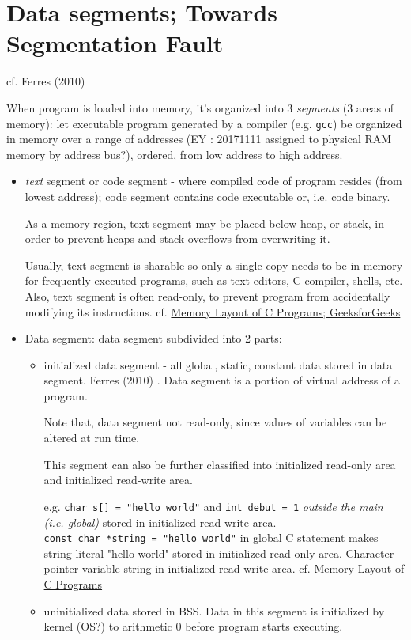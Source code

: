 \documentclass[10pt]{amsart}
\begin{document}
\section{Data segments; Towards Segmentation Fault}

cf. Ferres (2010) \cite{Ferr2010}

When program is loaded into memory, it's organized into 3 \emph{segments} (3 areas of memory):  
let executable program generated by a compiler (e.g. \verb|gcc|) be organized in memory over a range of addresses (EY : 20171111 assigned to physical RAM memory by address bus?), ordered, from low address to high address.  
\begin{itemize}
	\item \emph{text} segment or code segment - where compiled code of program resides (from lowest address); code segment contains code executable or, i.e. code binary.  
	
	As a memory region, text segment may be placed below heap, or stack, in order to prevent heaps and stack overflows from overwriting it.  
	
	Usually, text segment is sharable so only a single copy needs to be in memory for frequently executed programs, such as text editors, C compiler, shells, etc.  Also, text segment is often read-only, to prevent program from accidentally modifying its instructions.  	
	cf. \href{http://www.geeksforgeeks.org/memory-layout-of-c-program/}{Memory Layout of C Programs; GeeksforGeeks}  
	\item Data segment:  data segment subdivided into 2 parts:
	\begin{itemize}
		\item initialized data segment - all global, static, constant data stored in data segment. Ferres (2010) \cite{Ferr2010}.  Data segment is a portion of virtual address of a program.  
		
		Note that, data segment not read-only, since values of variables can be altered at run time.  
		
		This segment can also be further classified into initialized read-only area and initialized read-write area.  
		
		e.g. \verb|char s[] = "hello world"| and \verb|int debut = 1| \emph{outside the main (i.e. global)} stored in initialized read-write area.  \\
		\verb|const char *string = "hello world"| in global C statement makes string literal "hello world" stored in initialized read-only area.  Character pointer variable string in initialized read-write area.  
		cf. \href{http://www.geeksforgeeks.org/memory-layout-of-c-program/}{Memory Layout of C Programs}  
		\item uninitialized data stored in BSS.  Data in this segment is initialized by kernel (OS?) to arithmetic 0 before program starts executing.  
		

\end{itemize}
\end{itemize}
\end{document}

